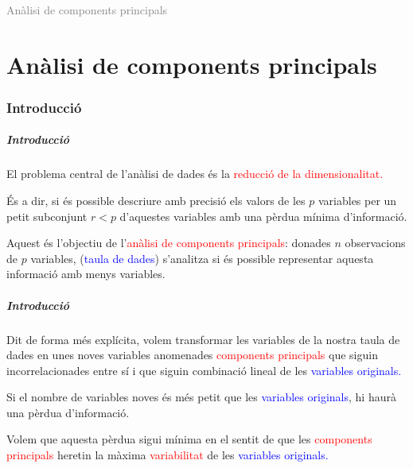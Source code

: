 \documentclass[12pt,t]{beamer}
\title[\red{Matemàtiques II}]{}
\author[]{}
\date{}
\newcommand{\red}[1]{\textcolor{red}{#1}}
\newcommand{\blue}[1]{\textcolor{blue}{#1}}
\newcommand{\gray}[1]{\textcolor{gray}{#1}}
\theoremstyle{plain}
\theoremstyle{definition}
\begin{document}

\beamertemplatedotitem

\lstset{breaklines=true}
\lstset{basicstyle=\ttfamily}



\begin{frame}
\vfill
\begin{center}
\gray{\LARGE Anàlisi de components principals}
\end{center}
\vfill
\end{frame}

\part{Anàlisi de components principals}

\section{Introducció}

\begin{frame}
\frametitle{Introducció}

El problema central de l'anàlisi de dades és la \red{reducció de la dimensionalitat.}
\medskip

És a dir, si és possible descriure amb precisió els valors de les $p$ variables per un petit subconjunt $r <p$ d'aquestes variables amb una pèrdua mínima d'informació.
\bigskip

Aquest és l'objectiu de l'\red{anàlisi de components principals}: donades $n$ observacions de $p$ variables, (\blue{taula de dades}) s'analitza si és possible representar aquesta informació amb menys variables.


\end{frame}

\begin{frame}
\frametitle{Introducció}
Dit de forma més explícita, volem transformar les variables de la nostra taula de dades en unes noves variables anomenades \red{components principals} que siguin incorrelacionades entre sí i que siguin combinació lineal de les \blue{variables originals.}
\medskip

Si el nombre de variables noves és més petit que les \blue{variables originals}, hi haurà una pèrdua d'informació. 
\medskip

Volem que aquesta pèrdua sigui mínima en el sentit de que les \red{components principals} heretin la màxima \red{variabilitat} de les \blue{variables originals.}
\end{frame}
\end{document}
